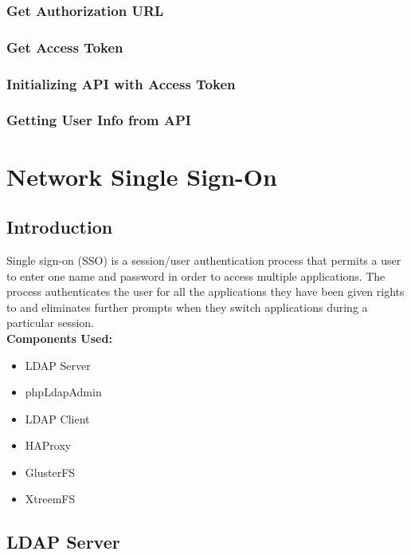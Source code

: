 \documentclass[12pt]{report}
\begin{document}
\subsection{Get Authorization URL}

\subsection{Get Access Token}

\subsection{Initializing API with Access Token}

\subsection{Getting User Info from API}


	
	
\chapter{Network Single Sign-On}
\section{Introduction}
	
	Single sign-on (SSO) is a session/user authentication process that permits a user to enter one name and password in order to access multiple applications. The process authenticates the user for all the applications they have been given rights to and eliminates further prompts when they switch applications during a particular session.\\
	\underline{} \newline
	\textbf{Components Used:} 
	\begin{itemize}
	\item LDAP Server
	\item phpLdapAdmin
	\item LDAP Client
	\item HAProxy
	\item GlusterFS
	\item XtreemFS
	\end{itemize}
	
\pagebreak

\section{LDAP Server}
\end{document}

